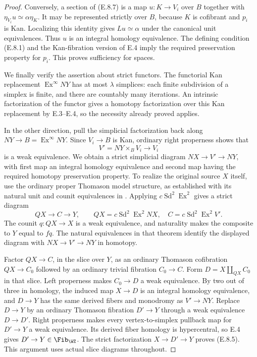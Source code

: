 \begin{proof}
Conversely, a section of (E.8.7) is a map $u:K\to V_i$ over $B$
together with
$\eta_{V_i}u\simeq\alpha\eta_K$. It may be represented strictly
over $B$, because $K$ is cofibrant and $p_i$ is Kan.
Localizing this identity gives $Lu\simeq\alpha$ under the
canonical unit equivalences. Thus $u$ is an integral homology
equivalence. The defining condition (E.8.1) and the
Kan-fibration version of E.4 imply the required preservation
property for $p_i$. This proves sufficiency for spaces.

We finally verify the assertion about strict functors. The
functorial Kan replacement $\operatorname{Ex}^{\infty}NY$ has
at most $\lambda$ simplices: each finite subdivision of a
simplex is finite, and there are countably many iterations.
An intrinsic factorization of the functor gives a homotopy
factorization over this Kan replacement by E.3--E.4, so the
necessity already proved applies.

In the other direction, pull the simplicial factorization back
along $NY\to B=\operatorname{Ex}^{\infty}NY$. Since $V_i\to B$
is Kan, ordinary right properness shows that
\[
                 V'=NY\times_BV_i\longrightarrow V_i
\]
is a weak equivalence. We obtain a strict simplicial diagram
$NX\to V'\to NY$, with first map an integral homology
equivalence and second map having the required homotopy
preservation property. To realize the original source $X$
itself, use the ordinary proper Thomason model structure,
as established with its natural unit and counit equivalences
in \cite[Theorem~5.2.12]{EH5Cisinski2006}. Applying
$c\operatorname{Sd}^2\operatorname{Ex}^2$ gives a strict diagram
\[
 QX\longrightarrow C\longrightarrow Y,\qquad
 QX=c\operatorname{Sd}^2\operatorname{Ex}^2NX,\quad
 C=c\operatorname{Sd}^2\operatorname{Ex}^2V'.
\]
The counit $q:QX\to X$ is a weak equivalence, and naturality
makes the composite to $Y$ equal to $fq$. The natural
equivalences in that theorem identify the displayed diagram
with $NX\to V'\to NY$ in homotopy.

Factor $QX\to C$, in the slice over $Y$, as an ordinary
Thomason cofibration $QX\to C_0$ followed by an ordinary trivial
fibration $C_0\to C$. Form
$D=X\amalg_{QX}C_0$ in that slice. Left properness makes
$C_0\to D$ a weak equivalence. By two out of three in homology,
the induced map $X\to D$ is an integral homology equivalence,
and $D\to Y$ has the same derived fibers and monodromy as
$V'\to NY$. Replace $D\to Y$ by an ordinary Thomason
fibration $D'\to Y$ through a weak equivalence $D\to D'$.
Right properness makes every vertex-to-simplex pullback map
for $D'\to Y$ a weak equivalence. Its derived fiber homology
is hypercentral, so E.4 gives $D'\to Y\in\Fib_{\WZ}$.
The strict factorization $X\to D'\to Y$ proves (E.8.5).
This argument uses actual slice diagrams throughout.
\end{proof}

